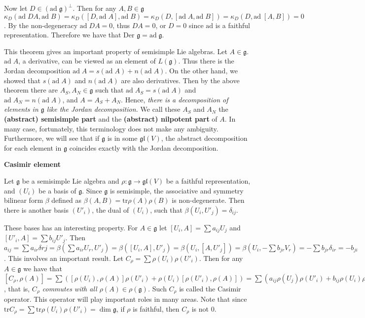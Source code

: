 \documentclass{article}
\newcommand{\tr}[1]{\mathrm{tr}#1}
\newcommand{\lie}[1]{\mathfrak{#1}}
\newcommand{\ad}[1]{\mathrm{ad}\; #1}
\begin{document}
Now let $D \in (\ad{\lie{g}})^\perp$.
Then for any $A, B \in \lie{g}$ $\kappa_D(\ad{DA}, \ad{B}) = \kappa_D([D, \ad{A}], \ad{B}) = \kappa_D(D, [\ad{A}, \ad{B}]) = \kappa_D(D, \ad{[A, B]}) = 0$.
By the non-degeneracy $\ad{DA} = 0$, thus $DA = 0$, or $D = 0$ since $\textrm{ad}$ is a faithful representation.
Therefore we have that $\textrm{Der }\lie{g} = \ad{\lie{g}}$.

This theorem gives an important property of semisimple Lie algebras.
Let $A \in \lie{g}$.
$\ad{A}$, a derivative, can be viewed as an element of $L(\lie{g})$.
Thus there is the Jordan decomposition $\ad{A} = s(\ad{A}) + n(\ad{A})$.
On the other hand, we showed that $s(\ad{A})$ and $n(\ad{A})$ are also derivatives.
Then by the above theorem there are $A_S, A_N \in \lie{g}$ such that $\ad{A_S} = s(\ad{A})$ and $\ad{A_N} = n(\ad{A})$, and $A = A_S + A_N$.
Hence, \textit{there is a decomposition of elements in $\lie{g}$ like the Jordan decomposition.}
We call these $A_S$ and $A_N$ the \textbf{(abstract) semisimple part} and the \textbf{(abstract) nilpotent part} of $A$.
In many case, fortunately, this terminology does not make any ambiguity.
Furthermore, we will see that if $\lie{g}$ is in some $\lie{gl}(V)$, the abstract decomposition for each element in $\lie{g}$ coincides exactly with the Jordan decomposition.

\newpage

\textbf{Casimir element}

Let $\lie{g}$ be a semisimple Lie algebra and $\rho : \lie{g} \to \lie{gl}(V)$ be a faithful representation, and $(U_i)$ be a basis of $\lie{g}$.
Since $\lie{g}$ is semisimple, the associative and symmetry bilinear form $\beta$ defined as $\beta(A, B) = \tr{\rho(A)\rho(B)}$ is non-degenerate.
Then there is another basis $(U'_i)$, the dual of $(U_i)$, such that $\beta(U_i, U'_j) = \delta_{ij}$.

These bases has an interesting property.
For $A \in \lie{g}$ let $[U_i, A] = \sum a_{ij} U_j$ and $[U'_i, A] = \sum b_{ij} U'_j$.
Then $a_{ij} = \sum a_{ir} \delta{rj} = \beta(\sum a_{ir} U_r, U'_j) = \beta([U_i, A], U'_j) = \beta(U_i, [A, U'_j]) = \beta(U_i, -\sum b_{jr} V_r) = -\sum b_{jr} \delta_{ir} = -b_{ji}$.
This involves an important result.
Let $C_\rho = \sum \rho(U_i) \rho(U'_i)$.
Then for any $A \in \lie{g}$ we have that $[C_\rho, \rho(A)] = \sum ([\rho(U_i), \rho(A)] \rho(U'_i) + \rho(U_i) [\rho(U'_i), \rho(A)]) = \sum (a_{ij} \rho(U_j) \rho(U'_i) + b_{ij} \rho(U_i) \rho(U'_j)) = \sum (a_{ij} \rho(U_j) \rho(U'_i) - a_{ji} \rho(U_i) \rho(U'_j)) = 0$, that is, \textit{$C_\rho$ commutes with all $\rho(A) \in \rho(\lie{g})$.}
Such $C_\rho$ is called the Casimir operator.
This operator will play important roles in many areas.
Note that since $\tr{C_\rho} = \sum \tr{\rho(U_i) \rho(U'_i)} = \dim{\lie{g}}$, if $\rho$ is faithful, then $C_\rho$ is not 0.
\end{document}
